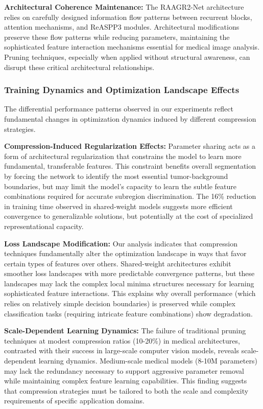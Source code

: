 \documentclass[12pt,a4paper]{article}
\begin{document}
\begin{enumerate}
\textbf{Architectural Coherence Maintenance:} The RAAGR2-Net architecture relies on carefully designed information flow patterns between recurrent blocks, attention mechanisms, and ReASPP3 modules. Architectural modifications preserve these flow patterns while reducing parameters, maintaining the sophisticated feature interaction mechanisms essential for medical image analysis. Pruning techniques, especially when applied without structural awareness, can disrupt these critical architectural relationships.

\subsubsection{Training Dynamics and Optimization Landscape Effects}

The differential performance patterns observed in our experiments reflect fundamental changes in optimization dynamics induced by different compression strategies.

\textbf{Compression-Induced Regularization Effects:} Parameter sharing acts as a form of architectural regularization that constrains the model to learn more fundamental, transferable features. This constraint benefits overall segmentation by forcing the network to identify the most essential tumor-background boundaries, but may limit the model's capacity to learn the subtle feature combinations required for accurate subregion discrimination. The 16\% reduction in training time observed in shared-weight models suggests more efficient convergence to generalizable solutions, but potentially at the cost of specialized representational capacity.

\textbf{Loss Landscape Modification:} Our analysis indicates that compression techniques fundamentally alter the optimization landscape in ways that favor certain types of features over others. Shared-weight architectures exhibit smoother loss landscapes with more predictable convergence patterns, but these landscapes may lack the complex local minima structures necessary for learning sophisticated feature interactions. This explains why overall performance (which relies on relatively simple decision boundaries) is preserved while complex classification tasks (requiring intricate feature combinations) show degradation.

\textbf{Scale-Dependent Learning Dynamics:} The failure of traditional pruning techniques at modest compression ratios (10-20\%) in medical architectures, contrasted with their success in large-scale computer vision models, reveals scale-dependent learning dynamics. Medium-scale medical models (8-10M parameters) may lack the redundancy necessary to support aggressive parameter removal while maintaining complex feature learning capabilities. This finding suggests that compression strategies must be tailored to both the scale and complexity requirements of specific application domains.


\end{enumerate}
\end{document}
